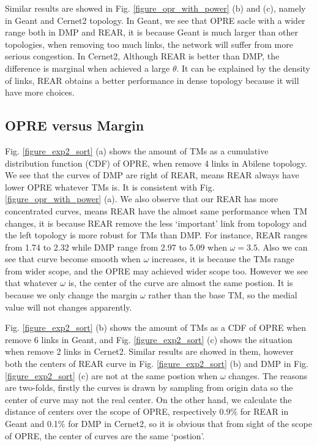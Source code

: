 \documentclass[conference]{IEEEtran}
\begin{document}
Similar results are showed in Fig. \ref{figure_opr_with_power} (b) and (c), namely in Geant and Cernet2 topology. In Geant, we see that OPRE sacle with a wider range both
in DMP and REAR, it is because Geant is much larger than other topologies, when removing too much links, the network will suffer from more 
serious congestion. In Cernet2, Although REAR is better than DMP, the difference is marginal when achieved a large $\theta$. It can be explained
by the density of links, REAR obtains a better performance in dense topology because it will have more choices.


\subsection{OPRE versus Margin}
Fig. \ref{figure_exp2_sort} (a) shows the amount of TMs as a cumulative distribution function (CDF) of OPRE, when remove 4 links in Abilene topology. We see that the curves of
DMP are right of REAR, means REAR always have lower OPRE whatever TMs is. It is consistent with Fig. \ref{figure_opr_with_power} (a). We also observe that our REAR has
more concentrated curves, means REAR have the almost same performance when TM changes, it is because REAR remove the less `important' link from 
topology and the left topology is more robust for TMs than DMP. For instance, REAR ranges from 1.74 to 2.32 while DMP range from 2.97 to 5.09 
when $\omega = 3.5$. Also we can see that curve become smooth when $\omega$ increases, it is because the TMs range from wider scope, and the OPRE
may achieved wider scope too. However we see that whatever $\omega$ is, the center of the curve are almost the same postion. It is because 
we only change the margin $\omega$ rather than the base TM, so the medial value will not changes apparently.


Fig. \ref{figure_exp2_sort} (b) shows the amount of TMs as a CDF of OPRE when remove 6 links in Geant, and Fig. \ref{figure_exp2_sort} (c) shows the situation when remove 2 links in Cernet2.
Similar results are showed in them, however both the centers of REAR curve in Fig. \ref{figure_exp2_sort} (b) and DMP in Fig. \ref{figure_exp2_sort} (c) are not at the same postion 
when $\omega$ changes. The reasons are two-folds, firstly the curves is drawn by sampling from origin data so the center of curve may not the real 
center. On the other hand, we calculate the distance of centers over the scope of OPRE, respectively 0.9\% for REAR in Geant and 0.1\% for DMP in Cernet2,
so it is obvious that from sight of the scope of OPRE, the center of curves are the same `postion'.
\end{document}
